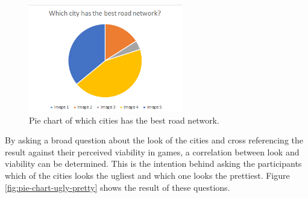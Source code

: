 \begin{figure}[h]
	\centering
	\includegraphics[width=0.6\textwidth]{"Images/RoadNetwork"}
	\caption{Pie chart of which cities has the best road network.}
	\label{fig:pie-chart-road-network}
\end{figure}

\newpage
By asking a broad question about the look of the cities and cross referencing the result against their perceived viability in games, a correlation between look and viability can be determined. This is the intention behind asking the participants which of the cities looks the ugliest and which one looks the prettiest. Figure \ref{fig:pie-chart-ugly-pretty} shows the result of these questions.

